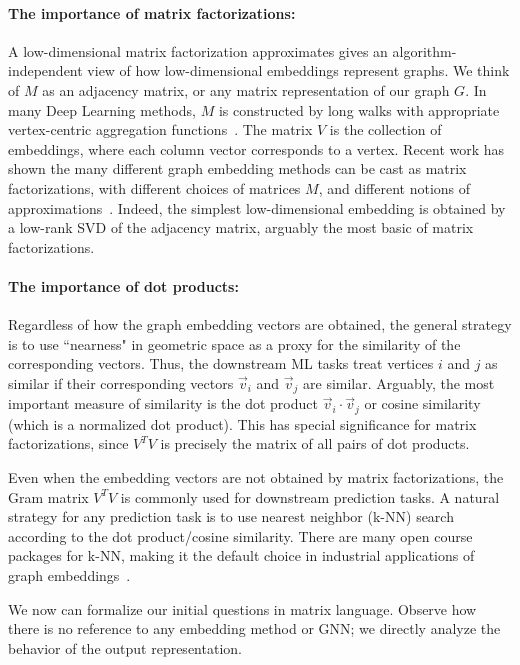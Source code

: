 \documentclass[11pt]{article}
\begin{document}
\paragraph{The importance of matrix factorizations:} A low-dimensional matrix factorization approximates
gives an algorithm-independent view of how low-dimensional embeddings represent graphs. We think
of $M$ as an adjacency matrix, or any matrix representation of our graph $G$. In many Deep Learning
methods, $M$ is constructed by long walks with appropriate vertex-centric aggregation functions~\cite{PeAlSk14,GrLe16,PeKu+17}.
The matrix $V$ is the collection of embeddings, where each column vector corresponds to a vertex.
Recent work has shown the many different graph embedding methods can be cast as matrix factorizations,
with different choices of matrices $M$, and different notions of approximations~\cite{QiDo18}. Indeed, the simplest
low-dimensional embedding is obtained by a low-rank SVD of the adjacency matrix, arguably the most
basic of matrix factorizations.

\medskip

\paragraph{The importance of dot products:} Regardless of how the graph embedding vectors are obtained,
the general strategy is to use ``nearness" in geometric space as a proxy for the similarity of the corresponding
vectors. Thus, the downstream ML tasks treat vertices $i$ and $j$ as similar if their corresponding
vectors $\vec{v}_i$ and $\vec{v}_j$ are similar. Arguably, the most important measure of similarity is 
the dot product $\vec{v}_i \cdot \vec{v}_j$ or cosine similarity (which is a normalized dot product). 
This has special significance for matrix factorizations,
since $V^TV$ is precisely the matrix of all pairs of dot products.

Even when the embedding vectors are not obtained by matrix factorizations, the Gram
matrix $V^TV$ is commonly used for downstream prediction tasks. A natural strategy for any prediction task 
is to use nearest neighbor (k-NN) search according to the dot product/cosine similarity. There are many open course packages for k-NN, making it 
the default choice in industrial applications of graph embeddings~\cite{Sci}. 

\medskip

We now can formalize our initial questions in matrix language. 
Observe how there is no reference to any embedding method or GNN;
we directly analyze the behavior of the output representation.
\end{document}
